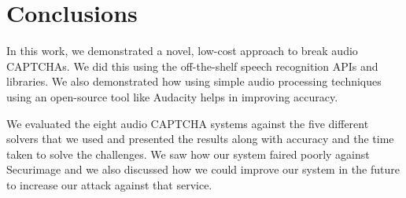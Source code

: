 \section{Conclusions}
\label{sec:conclusions}

In this work, we demonstrated a novel, low-cost approach to break audio CAPTCHAs. We did this using the off-the-shelf speech recognition APIs and libraries. We also demonstrated how using simple audio processing techniques using an open-source tool like Audacity helps in improving accuracy.\newline

We evaluated the eight audio CAPTCHA systems against the five different solvers that we used and presented the results along with accuracy and the time taken to solve the challenges. We saw how our system faired poorly against Securimage and we also discussed how we could improve our system in the future to increase our attack against that service. 
